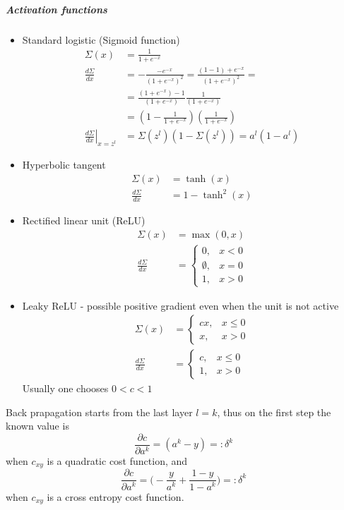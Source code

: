 \documentclass[draft]{article}
\begin{document}
\subparagraph{Activation functions}
\begin{itemize}
  \item Standard logistic (Sigmoid function) \begin{align}
\Sigma(x) &= \frac{1}{1+e^{-x}} \\
\frac{d\Sigma}{dx} &= - \frac{-e^{-x}}{(1+e^{-x})^2} 
= \frac{(1 - 1) + e^{-x}}{(1+e^{-x})^2} = \\
&= \frac{(1+e^{-x}) - 1}{(1+e^{-x})} \frac{1}{(1+e^{-x})} \\
&= \left(1 - \frac{1}{1+e^{-x}}\right) \left(\frac{1}{1+e^{-x}}\right) \\
\left. \frac{d\Sigma}{dx}\right|_{x=z^l} &= \Sigma(z^l)(1 - \Sigma(z^l)) 
= a^l(1 - a^l)
\end{align}
\item Hyperbolic tangent \begin{align}
  \Sigma(x) &= \tanh (x) \\
  \frac{d\Sigma}{dx} &=1 - \tanh^2 (x)
\end{align}
\item Rectified linear unit (ReLU) \begin{align}
  \Sigma(x) &= \max (0, x)\\
  \frac{d\Sigma}{dx} &= \begin{cases}
    0, & x < 0 \\
    \emptyset, & x = 0 \\
    1, & x > 0
  \end{cases}
\end{align}
\item Leaky ReLU - possible positive gradient even when the unit is not active \begin{align}
  \Sigma(x) &= \begin{cases}
    c x, & x \leqslant 0 \\
    x, & x > 0
  \end{cases} \\
  \frac{d\Sigma}{dx} &= \begin{cases}
    c, & x \leqslant 0 \\
    1, & x > 0
  \end{cases}
\end{align}
Usually one chooses $0 < c < 1$
\end{itemize}

Back prapagation starts from the last layer $l=k$, thus on the first step the known value is
\[
\frac{\partial c}{\partial a^k} = (a^k - y) =: \delta^k
\]
when $c_{xy}$ is a quadratic cost function, and
\[
\frac{\partial c}{\partial a^k} = \biggl(-\frac{y}{a^k}+\frac{1-y}{1-a^k} \biggr) =: \delta^k
\]
when $c_{xy}$ is a cross entropy cost function.
\end{document}
